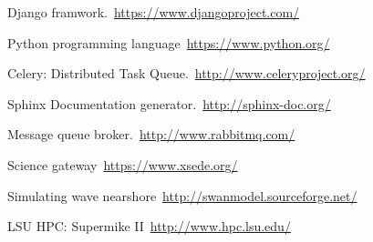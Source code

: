 \cleardoublepage
{}
{}
\begin{thebibliography}{99}

Django framwork.\ \url{https://www.djangoproject.com/}

 Python programming language\ \url{https://www.python.org/}

Celery: Distributed Task Queue.\ \url{http://www.celeryproject.org/}

 Sphinx Documentation generator.\ \url{http://sphinx-doc.org/}

 Message queue broker.\ \url{http://www.rabbitmq.com/}

 Science gateway\ \url{https://www.xsede.org/}

 Simulating wave nearshore\ \url{http://swanmodel.sourceforge.net/}

 LSU HPC: Supermike II\ \url{http://www.hpc.lsu.edu/}
\end{thebibliography}
